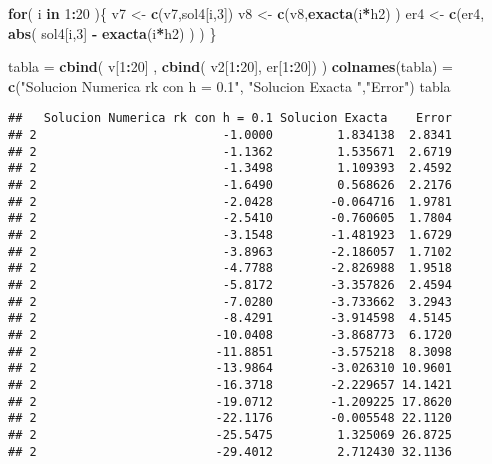 \documentclass[]{article}
\newenvironment{Shaded}{\begin{snugshade}}{\end{snugshade}}
\newcommand{\KeywordTok}[1]{\textcolor[rgb]{0.13,0.29,0.53}{\textbf{#1}}}
\newcommand{\DecValTok}[1]{\textcolor[rgb]{0.00,0.00,0.81}{#1}}
\newcommand{\StringTok}[1]{\textcolor[rgb]{0.31,0.60,0.02}{#1}}
\newcommand{\ControlFlowTok}[1]{\textcolor[rgb]{0.13,0.29,0.53}{\textbf{#1}}}
\newcommand{\OperatorTok}[1]{\textcolor[rgb]{0.81,0.36,0.00}{\textbf{#1}}}
\newcommand{\NormalTok}[1]{#1}
\begin{document}
\begin{Shaded}
\begin{Highlighting}[]
\ControlFlowTok{for}\NormalTok{( i }\ControlFlowTok{in} \DecValTok{1}\OperatorTok{:}\DecValTok{20}\NormalTok{ )\{}
\NormalTok{  v7 <-}\StringTok{ }\KeywordTok{c}\NormalTok{(v7,sol4[i,}\DecValTok{3}\NormalTok{])}
\NormalTok{  v8 <-}\StringTok{ }\KeywordTok{c}\NormalTok{(v8,}\KeywordTok{exacta}\NormalTok{(i}\OperatorTok{*}\NormalTok{h2) )}
\NormalTok{  er4 <-}\StringTok{ }\KeywordTok{c}\NormalTok{(er4, }\KeywordTok{abs}\NormalTok{( sol4[i,}\DecValTok{3}\NormalTok{] }\OperatorTok{-}\StringTok{ }\KeywordTok{exacta}\NormalTok{(i}\OperatorTok{*}\NormalTok{h2) ) )}
\NormalTok{\}}


\NormalTok{tabla =}\StringTok{ }\KeywordTok{cbind}\NormalTok{( v[}\DecValTok{1}\OperatorTok{:}\DecValTok{20}\NormalTok{] , }\KeywordTok{cbind}\NormalTok{( v2[}\DecValTok{1}\OperatorTok{:}\DecValTok{20}\NormalTok{], er[}\DecValTok{1}\OperatorTok{:}\DecValTok{20}\NormalTok{]) )}
\KeywordTok{colnames}\NormalTok{(tabla) =}\StringTok{ }\KeywordTok{c}\NormalTok{(}\StringTok{"Solucion Numerica rk con h = 0.1"}\NormalTok{, }\StringTok{"Solucion Exacta "}\NormalTok{,}\StringTok{"Error"}\NormalTok{)}
\NormalTok{tabla}
\end{Highlighting}
\end{Shaded}

\begin{verbatim}
##   Solucion Numerica rk con h = 0.1 Solucion Exacta    Error
## 2                          -1.0000         1.834138  2.8341
## 2                          -1.1362         1.535671  2.6719
## 2                          -1.3498         1.109393  2.4592
## 2                          -1.6490         0.568626  2.2176
## 2                          -2.0428        -0.064716  1.9781
## 2                          -2.5410        -0.760605  1.7804
## 2                          -3.1548        -1.481923  1.6729
## 2                          -3.8963        -2.186057  1.7102
## 2                          -4.7788        -2.826988  1.9518
## 2                          -5.8172        -3.357826  2.4594
## 2                          -7.0280        -3.733662  3.2943
## 2                          -8.4291        -3.914598  4.5145
## 2                         -10.0408        -3.868773  6.1720
## 2                         -11.8851        -3.575218  8.3098
## 2                         -13.9864        -3.026310 10.9601
## 2                         -16.3718        -2.229657 14.1421
## 2                         -19.0712        -1.209225 17.8620
## 2                         -22.1176        -0.005548 22.1120
## 2                         -25.5475         1.325069 26.8725
## 2                         -29.4012         2.712430 32.1136
\end{verbatim}
\end{document}
